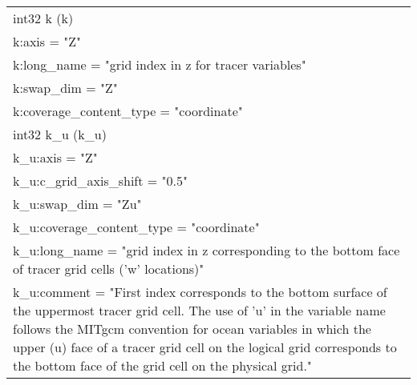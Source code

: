 \begin{longtable}{|p{\textwidth}|}
\rowcolor{Apricot}\hspace{0.5cm}int32 k (k)\\
\rowcolor{Apricot}\hspace{0.5cm}\hspace{0.5cm}k:axis = "Z"\\
\rowcolor{Apricot}\hspace{0.5cm}\hspace{0.5cm}k:long\_name = "grid index in z for tracer variables"\\
\rowcolor{Apricot}\hspace{0.5cm}\hspace{0.5cm}k:swap\_dim = "Z"\\
\rowcolor{Apricot}\hspace{0.5cm}\hspace{0.5cm}k:coverage\_content\_type = "coordinate"\\
\rowcolor{Apricot}\hspace{0.5cm}int32 k\_u (k\_u)\\
\rowcolor{Apricot}\hspace{0.5cm}\hspace{0.5cm}k\_u:axis = "Z"\\
\rowcolor{Apricot}\hspace{0.5cm}\hspace{0.5cm}k\_u:c\_grid\_axis\_shift = "0.5"\\
\rowcolor{Apricot}\hspace{0.5cm}\hspace{0.5cm}k\_u:swap\_dim = "Zu"\\
\rowcolor{Apricot}\hspace{0.5cm}\hspace{0.5cm}k\_u:coverage\_content\_type = "coordinate"\\
\rowcolor{Apricot}\hspace{0.5cm}\hspace{0.5cm}k\_u:long\_name = "grid index in z corresponding to the bottom face of tracer grid cells ('w' locations)"\\
\rowcolor{Apricot}\hspace{0.5cm}\hspace{0.5cm}k\_u:comment = "First index corresponds to the bottom surface of the uppermost tracer grid cell. The use of 'u' in the variable name follows the MITgcm convention for ocean variables in which the upper (u) face of a tracer grid cell on the logical grid corresponds to the bottom face of the grid cell on the physical grid."\\

\end{longtable}
